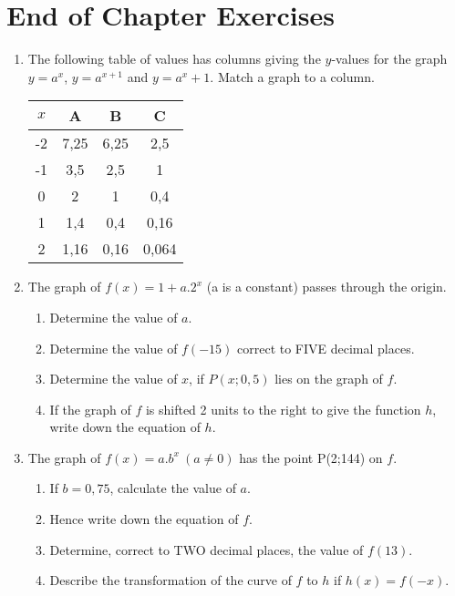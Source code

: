 \section{End of Chapter Exercises}
\begin{enumerate}
\item{The following table of values has columns giving the $y$-values for the graph $y = a^x$, $y = a ^{x+1}$  and $y = a^x + 1$.  Match a graph to a column.
\begin{center}
\begin{tabular}{|c|c|c|c|}\hline
$x$ & A & B & C\\\hline
-2 & 7,25 & 6,25 & 2,5\\\hline
-1 & 3,5 & 2,5 & 1\\\hline
0 & 2 & 1 & 0,4\\\hline
1 & 1,4 & 0,4 & 0,16\\\hline
2 & 1,16 & 0,16 & 0,064\\\hline
\end{tabular}
\end{center}
}
\item{The graph of $f(x) = 1+ a.2^x$ (a is a constant) passes through the origin.}{
\begin{enumerate}
 \item{Determine the value of $a$.}
 \item{Determine the value of $f(-15)$ correct to FIVE decimal places.}
 \item{Determine the value of $x$, if $P(x; 0,5)$ lies on the graph of $f$.}
 \item{If the graph of $f$ is shifted 2 units to the right to give the function $h$, write down the equation of $h$.}
  \end{enumerate}}
\item{The graph of $f(x) = a.b^x ~(a \neq 0)$ has the point P(2;144) on $f$.}{
\begin{enumerate}
\item{If $b = 0,75$, calculate the value of $a$.}
\item{Hence write down the equation of $f$.}
\item{Determine, correct to TWO decimal places, the value of $f(13)$.}
\item{Describe the transformation of the curve of $f$ to $h$ if $h(x) = f(-x)$.}
\end{enumerate}}
\end{enumerate}







